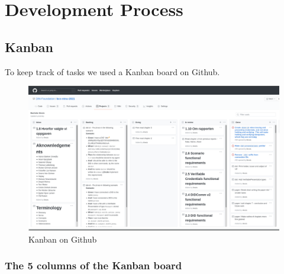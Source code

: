 \hypertarget{development-process}{%
\chapter{Development Process}\label{development-process}}

\hypertarget{kanban}{%
\section{Kanban}\label{kanban}}

To keep track of tasks we used a Kanban board on Github.


\begin{figure}[H]
\centering
\includegraphics[width=\textwidth]{Development Process a132dd5987b94adf8fc5989add9afc3f/Untitled.png}
\caption{Kanban on Github}
\end{figure}




\pagebreak




\hypertarget{the-5-columns-of-the-kanban-board}{%
\subsection{The 5 columns of the Kanban
board}\label{the-5-columns-of-the-kanban-board}}

